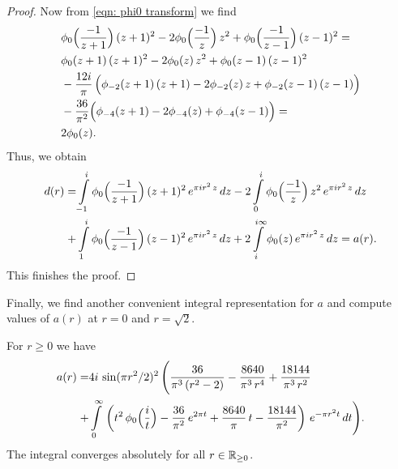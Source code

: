 \begin{proof}
Now from \eqref{eqn: phi0 transform} we find
\begin{align}&\phi_0\Big(\frac{-1}{z+1}\Big)\,(z+1)^2-2\phi_0\Big(\frac{-1}{z}\Big)\,z^2+
\phi_0\Big(\frac{-1}{z-1}\Big)\,(z-1)^2=\notag\\
&\phi_0(z+1)\,(z+1)^2-2\phi_0(z)\,z^2+\phi_0(z-1)\,(z-1)^2\notag\\
&-\frac{12i}{\pi}\,\Big(\phi_{-2}(z+1)\,(z+1)-2\phi_{-2}(z)\,z+\phi_{-2}(z-1)\,(z-1)\Big)\notag\\
&-\frac{36}{\pi^2}\Big(\phi_{-4}(z+1)-2\phi_{-4}(z)+\phi_{-4}(z-1)\Big)=\notag\\
&2\phi_0(z).
  \end{align}
  Thus, we obtain
  \begin{align}
  d(r)=&\int\limits_{-1}^{i}\phi_0\Big(\frac{-1}{z+1}\Big)\,(z+1)^2\,e^{\pi i r^2 \,z}\,dz
  -2\int\limits_{0}^{i}\phi_0\Big(\frac{-1}{z}\Big)\,z^2\,e^{\pi i r^2 \,z}\,dz\notag\\
  +&\int\limits_{1}^{i}\phi_0\Big(\frac{-1}{z-1}\Big)\,(z-1)^2\,e^{\pi i r^2 \,z}\,dz
  +2\int\limits_{i}^{i\infty}\phi_0(z)\,e^{\pi i r^2 \,z}\,dz=a(r).\notag
\end{align}
This finishes the proof.
\end{proof}
Finally, we find another convenient integral representation for $a$ and compute values of $a(r)$ at $r=0$ and $r=\sqrt{2}$.
\begin{proposition}\label{prop: a another integral}
For $r\geq0$ we have
\begin{align}\label{eqn: a another integral}a(r)=&4i\,\sin(\pi r^2/2)^2\,\Bigg(\frac{36}{\pi^3\,(r^2-2)}-\frac{8640}{\pi^3\,r^4}+\frac{18144}{\pi^3\,r^2}\\ +&\int\limits_0^\infty\,\left(t^2\,\phi_0\Big(\frac{i}{t}\Big)-\frac{36}{\pi^2}\,e^{2\pi t}+\frac{8640}{\pi}\,t-\frac{18144}{\pi^2}\right)\,e^{-\pi r^2 t}\,dt \Bigg) .\notag\end{align}
The integral converges absolutely for all $r\in\mathbb{R}_{\geq 0}$.
\end{proposition}
